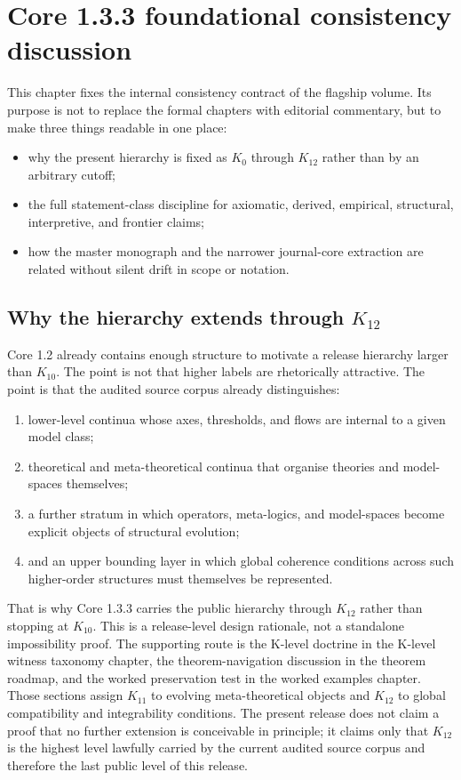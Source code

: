\section{Core 1.3.3 foundational consistency discussion}
\label{sec:oc13-foundational-consistency}

This chapter fixes the internal consistency contract of the flagship volume.
Its purpose is not to replace the formal chapters with editorial commentary,
but to make three things readable in one place:

\begin{itemize}
\item why the present hierarchy is fixed as \(K_0\) through \(K_{12}\) rather
      than by an arbitrary cutoff;
\item the full statement-class discipline for axiomatic, derived, empirical,
      structural, interpretive, and frontier claims;
\item how the master monograph and the narrower journal-core extraction are
      related without silent drift in scope or notation.
\end{itemize}

\subsection{Why the hierarchy extends through \texorpdfstring{$K_{12}$}{K12}}

Core 1.2 already contains enough structure to motivate a release hierarchy
larger than \(K_{10}\). The point is not that higher labels are rhetorically
attractive. The point is that the audited source corpus already distinguishes:

\begin{enumerate}
\item lower-level continua whose axes, thresholds, and flows are internal to a
      given model class;
\item theoretical and meta-theoretical continua that organise theories and
      model-spaces themselves;
\item a further stratum in which operators, meta-logics, and model-spaces
      become explicit objects of structural evolution;
\item and an upper bounding layer in which global coherence conditions across
      such higher-order structures must themselves be represented.
\end{enumerate}

That is why Core 1.3.3 carries the public hierarchy through \(K_{12}\) rather
than stopping at \(K_{10}\). This is a release-level design rationale, not a
standalone impossibility proof. The supporting route is the K-level doctrine in
the K-level witness taxonomy chapter, the theorem-navigation discussion in
the theorem roadmap, and the worked preservation test in
the worked examples chapter. Those sections assign \(K_{11}\) to
evolving meta-theoretical objects and \(K_{12}\) to global compatibility and
integrability conditions. The present release does not claim a proof that no
further extension is conceivable in principle; it claims only that \(K_{12}\)
is the highest level lawfully carried by the current audited source corpus and
therefore the last public level of this release.

